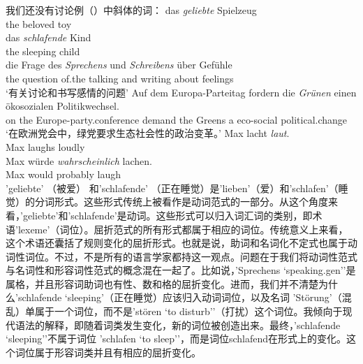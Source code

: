 我们还没有讨论例（）中斜体的词：
\eal
\ex 
\gll das \emph{geliebte} Spielzeug\\
	 the beloved toy\\
\ex 
\gll das \emph{schlafende} Kind\\
	 the sleeping child\\
\ex 
\gll die Frage des \emph{Sprechens} und \emph{Schreibens} über Gefühle\\
	 the question of.the talking and writing about feelings\\
\glt `有关讨论和书写感情的问题'
\ex 
\gll Auf dem Europa-Parteitag fordern die \emph{Grünen} einen ökosozialen Politikwechsel.\\
	 on the Europe-party.conference demand the Greens a eco-social political.change\\
\glt `在欧洲党会中，绿党要求生态社会性的政治变革。'
\ex\label{Wortart-adverbiales-Adjektiv} 
\gll Max lacht \emph{laut}.\\
	 Max laughs loudly\\
\ex\label{Wortart-Satzadverb-Adjektiv} 
\gll Max würde \emph{wahrscheinlich} lachen.\\
	 Max would probably laugh\\
\zl
'geliebte' （被爱） 和'schlafende' （正在睡觉）是'lieben'（爱）和'schlafen'（睡觉）的分词形式。这些形式传统上被看作是动词范式的一部分。从这个角度来看，'geliebte'和'schlafende'是动词。这些形式可以归入词汇词的类别，即术语'lexeme'（词位）。屈折范式的所有形式都属于相应的词位。传统意义上来看，这个术语还囊括了规则变化的屈折形式。也就是说，助词和名词化不定式也属于动词性词位。不过，不是所有的语言学家都持这一观点。问题在于我们将动词性范式与名词性和形容词性范式的概念混在一起了。比如说，'Sprechens ‘speaking.gen’'是属格，并且形容词助词也有性、数和格的屈折变化。进而，我们并不清楚为什么'schlafende ‘sleeping’（正在睡觉）应该归入动词词位，以及名词 'Störung'（混乱）单属于一个词位，而不是'stören ‘to disturb’'（打扰）这个词位。我倾向于现代语法的解释，即随着词类发生变化，新的词位被创造出来。最终，'schlafende ‘sleeping’'不属于词位 'schlafen ‘to sleep’'，而是词位schlafend在形式上的变化。这个词位属于形容词类并且有相应的屈折变化。
